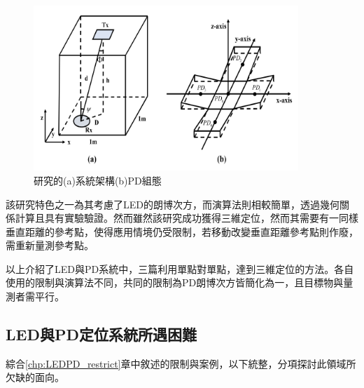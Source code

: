 \begin{description}
        \begin{figure}[h]
            \centering
            \includegraphics[width=10cm]{ch2pic/case_cart3d.png}
            \caption{\cite{case:cart3d}研究的(a)系統架構(b)PD組態}
            \label{pic:case_cart3d}
        \end{figure}

        該研究特色之一為其考慮了LED的朗博次方，而演算法則相較簡單，透過幾何關係計算且具有實驗驗證。然而雖然該研究成功獲得三維定位，然而其需要有一同樣垂直距離的參考點，使得應用情境仍受限制，若移動改變垂直距離參考點則作廢，需重新量測參考點。

    \end{description}

    以上介紹了LED與PD系統中，三篇利用單點對單點，達到三維定位的方法。各自使用的限制與演算法不同，共同的限制為PD朗博次方皆簡化為一，且目標物與量測者需平行。







    \subsection{LED與PD定位系統所遇困難}
    \label{chp:LEDPD_problem}
        
    綜合\ref{chp:LEDPD_restrict}章中敘述的限制與案例，以下統整，分項探討此領域所欠缺的面向。
    
